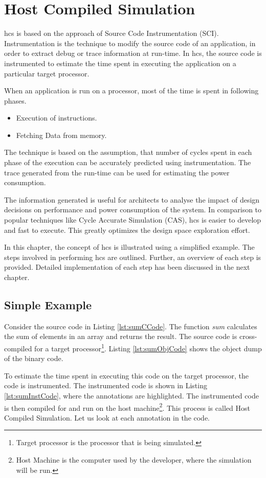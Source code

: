 \chapter{Host Compiled Simulation}

\gls{hcs} is based on the approach of Source Code Instrumentation (SCI). Instrumentation is the technique to modify the source code of an application, in order to extract debug or trace information at run-time. In \gls{hcs}, the source code is instrumented to estimate the time spent in executing the application on a particular target processor. 

When an application is run on a processor, most of the time is spent in following phases.
\begin{itemize} \itemsep -6pt
\item Execution of instructions.
\item Fetching Data from memory.
\end{itemize}

The technique is based on the assumption, that number of cycles spent in each phase of the execution can be accurately predicted using instrumentation. The trace generated from the run-time can be used for estimating the power consumption.

The information generated is useful for architects to analyse the impact of design decisions on performance and power consumption of the system. In comparison to popular techniques like Cycle Accurate Simulation (CAS), \gls{hcs} is easier to develop and fast to execute. This greatly optimizes the design space exploration effort.

In this chapter, the concept of \gls{hcs} is illustrated using a simplified example. The steps involved in performing \gls{hcs} are outlined. Further, an overview of each step is provided. Detailed implementation of each step has been discussed in the next chapter.

\section{Simple Example}

Consider the source code in Listing \ref{lst:sumCCode}. The function \emph{sum} calculates the sum of elements in an array and returns the result. The source code is cross-compiled for a target processor\footnote{Target processor is the processor that is being simulated.}. Listing \ref{lst:sumObjCode} shows the object dump of the binary code. 

To estimate the time spent in executing this code on the target processor, the code is instrumented. The instrumented code is shown in Listing \ref{lst:sumInstCode}, where the annotations are highlighted. The instrumented code is then compiled for and run on the host machine\footnote{Host Machine is the computer used by the developer, where the simulation will be run.}. This process is called Host Compiled Simulation. Let us look at each annotation in the code.

